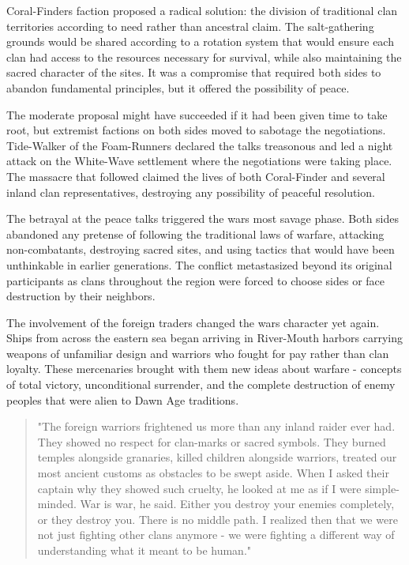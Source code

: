 Coral-Finder\textquotesingle s faction proposed a radical solution: the
division of traditional clan territories according to need rather than
ancestral claim. The salt-gathering grounds would be shared according to
a rotation system that would ensure each clan had access to the
resources necessary for survival, while also maintaining the sacred
character of the sites. It was a compromise that required both sides to
abandon fundamental principles, but it offered the possibility of peace.

The moderate proposal might have succeeded if it had been given time to
take root, but extremist factions on both sides moved to sabotage the
negotiations. Tide-Walker of the Foam-Runners declared the talks
treasonous and led a night attack on the White-Wave settlement where the
negotiations were taking place. The massacre that followed claimed the
lives of both Coral-Finder and several inland clan representatives,
destroying any possibility of peaceful resolution.

The betrayal at the peace talks triggered the war\textquotesingle s most
savage phase. Both sides abandoned any pretense of following the
traditional laws of warfare, attacking non-combatants, destroying sacred
sites, and using tactics that would have been unthinkable in earlier
generations. The conflict metastasized beyond its original participants
as clans throughout the region were forced to choose sides or face
destruction by their neighbors.

The involvement of the foreign traders changed the war\textquotesingle s
character yet again. Ships from across the eastern sea began arriving in
River-Mouth harbors carrying weapons of unfamiliar design and warriors
who fought for pay rather than clan loyalty. These mercenaries brought
with them new ideas about warfare - concepts of total victory,
unconditional surrender, and the complete destruction of enemy peoples
that were alien to Dawn Age traditions.

\begin{quote}
"The foreign warriors frightened us more than any inland raider ever
had. They showed no respect for clan-marks or sacred symbols. They
burned temples alongside granaries, killed children alongside warriors,
treated our most ancient customs as obstacles to be swept aside. When I
asked their captain why they showed such cruelty, he looked at me as if
I were simple-minded. \textquotesingle War is war,\textquotesingle{} he
said. \textquotesingle Either you destroy your enemies completely, or
they destroy you. There is no middle path.\textquotesingle{} I realized
then that we were not just fighting other clans anymore - we were
fighting a different way of understanding what it meant to be human."
\end{quote}

